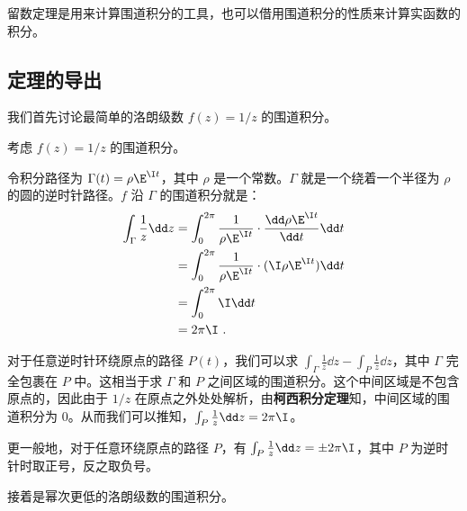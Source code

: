 

留数定理是用来计算围道积分的工具，也可以借用围道积分的性质来计算实函数的积分。

\subsection{定理的导出}

我们首先讨论最简单的洛朗级数 $f(z)=1/z$ 的围道积分。

\begin{example}{}\label{ex_ResThe_1}
考虑 $f(z)=1/z$ 的围道积分。

令积分路径为 $\Gamma(t)=\rho\E^{\I t}$，其中 $\rho$ 是一个常数。$\Gamma$ 就是一个绕着一个半径为 $\rho$ 的圆的逆时针路径。$f$ 沿 $\Gamma$ 的围道积分就是：
\begin{equation}\label{eq_ResThe_1}
\begin{aligned}
\int_{\Gamma}\frac{1}{z}\dd z&=\int^{2\pi}_0\frac{1}{\rho\E^{\I t}}\cdot\frac{\dd\rho\E^{\I t}}{\dd t}\dd t\\
&=\int_0^{2\pi}\frac{1}{\rho\E^{\I t}}\cdot (\I \rho \E^{\I t})\dd t\\
&=\int_0^{2\pi}\I\dd t\\
&=2\pi\I~.
\end{aligned}
\end{equation}

对于任意逆时针环绕原点的路径 $P(t)$，我们可以求 $\int_{\Gamma}\frac{1}{z}\dd z-\int_{P}\frac{1}{z}\dd z$，其中 $\Gamma$ 完全包裹在 $P$ 中。这相当于求 $\Gamma$ 和 $P$ 之间区域的围道积分。这个中间区域是不包含原点的，因此由于 $1/z$ 在原点之外处处解析，由\textbf{柯西积分定理}知，中间区域的围道积分为 $0$。从而我们可以推知，$\int_{P}\frac{1}{z}\dd z=2\pi\I$。

更一般地，对于任意环绕原点的路径 $P$，有 $\int_{P}\frac{1}{z}\dd z=\pm 2\pi\I$，其中 $P$ 为逆时针时取正号，反之取负号。

\end{example}

接着是幂次更低的洛朗级数的围道积分。

